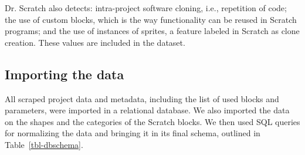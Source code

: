 \documentclass[10pt, conference]{IEEEtran}
\begin{document}
Dr. Scratch also detects: intra-project software cloning, i.e., repetition of code; the use of custom blocks, which is the way functionality can be reused in Scratch programs; and the use of instances of sprites, a feature labeled in Scratch as clone creation. These values are included in the dataset.

\subsection{Importing the data}
\label{dataAnalysis}
All scraped project data and metadata, including the list of used blocks and parameters, were imported in a relational database.
We also imported the data on the shapes and the categories of the Scratch blocks.
We then used SQL queries for normalizing the data and bringing it in its final schema, outlined in Table~\ref{tbl-dbschema}.
\end{document}
